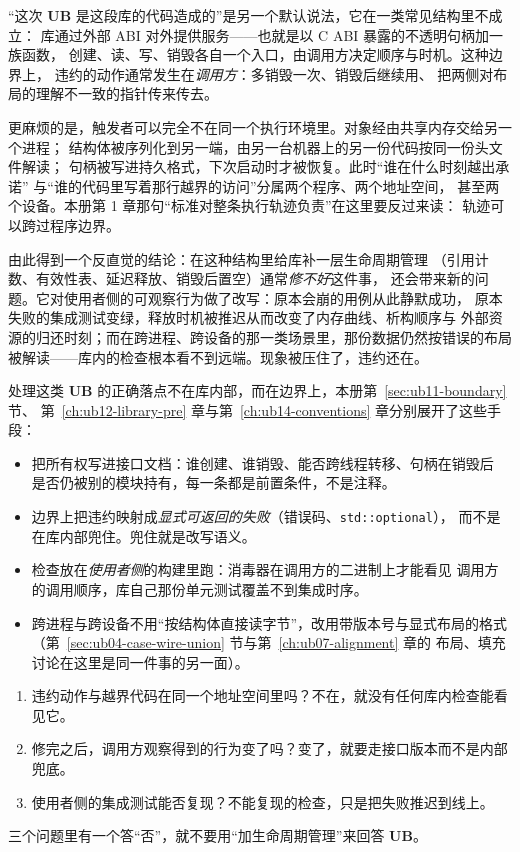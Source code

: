 \documentclass[12pt,a4paper,fontset=fandol]{ctexbook}
\newcommand{\Tp}[1]{\texttt{#1}}
\newcommand{\UB}{\textbf{\textsf{UB}}}
\begin{document}
“这次 \UB{} 是这段库的代码造成的”是另一个默认说法，它在一类常见结构里不成立：
库通过外部 ABI 对外提供服务——也就是以 C ABI 暴露的不透明句柄加一族函数，
创建、读、写、销毁各自一个入口，由调用方决定顺序与时机。这种边界上，
违约的动作通常发生在\emph{调用方}：多销毁一次、销毁后继续用、
把两侧对布局的理解不一致的指针传来传去。

更麻烦的是，触发者可以完全不在同一个执行环境里。对象经由共享内存交给另一个进程；
结构体被序列化到另一端，由另一台机器上的另一份代码按同一份头文件解读；
句柄被写进持久格式，下次启动时才被恢复。此时“谁在什么时刻越出承诺”
与“谁的代码里写着那行越界的访问”分属两个程序、两个地址空间，
甚至两个设备。本册第 1 章那句“标准对整条执行轨迹负责”在这里要反过来读：
轨迹可以跨过程序边界。

由此得到一个反直觉的结论：在这种结构里给库补一层生命周期管理
（引用计数、有效性表、延迟释放、销毁后置空）通常\emph{修不好}这件事，
还会带来新的问题。它对使用者侧的可观察行为做了改写：原本会崩的用例从此静默成功，
原本失败的集成测试变绿，释放时机被推迟从而改变了内存曲线、析构顺序与
外部资源的归还时刻；而在跨进程、跨设备的那一类场景里，那份数据仍然按错误的布局
被解读——库内的检查根本看不到远端。现象被压住了，违约还在。

处理这类 \UB{} 的正确落点不在库内部，而在边界上，本册第~\ref{sec:ub11-boundary} 节、
第~\ref{ch:ub12-library-pre} 章与第~\ref{ch:ub14-conventions} 章分别展开了这些手段：

\begin{itemize}
  \item 把所有权写进接口文档：谁创建、谁销毁、能否跨线程转移、句柄在销毁后
        是否仍被别的模块持有，每一条都是前置条件，不是注释。
  \item 边界上把违约映射成\emph{显式可返回的失败}（错误码、\Tp{std::optional}），
        而不是在库内部兜住。兜住就是改写语义。
  \item 检查放在\emph{使用者侧}的构建里跑：消毒器在调用方的二进制上才能看见
        调用方的调用顺序，库自己那份单元测试覆盖不到集成时序。
  \item 跨进程与跨设备不用“按结构体直接读字节”，改用带版本号与显式布局的格式
        （第~\ref{sec:ub04-case-wire-union} 节与第~\ref{ch:ub07-alignment} 章的
        布局、填充讨论在这里是同一件事的另一面）。
\end{itemize}

\begin{guideline}[title={问三个问题再决定“谁来修”}]
\begin{enumerate}
  \item 违约动作与越界代码在同一个地址空间里吗？不在，就没有任何库内检查能看见它。
  \item 修完之后，调用方观察得到的行为变了吗？变了，就要走接口版本而不是内部兜底。
  \item 使用者侧的集成测试能否复现？不能复现的检查，只是把失败推迟到线上。
\end{enumerate}
三个问题里有一个答“否”，就不要用“加生命周期管理”来回答 \UB{}。
\end{guideline}
\end{document}
